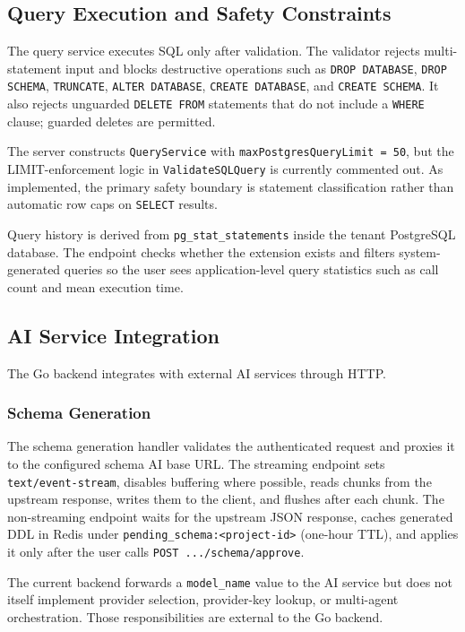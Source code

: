 \subsection{Query Execution and Safety Constraints}

The query service executes SQL only after validation. The validator rejects multi-statement input and blocks destructive operations such as \texttt{DROP DATABASE}, \texttt{DROP SCHEMA}, \texttt{TRUNCATE}, \texttt{ALTER DATABASE}, \texttt{CREATE DATABASE}, and \texttt{CREATE SCHEMA}. It also rejects unguarded \texttt{DELETE FROM} statements that do not include a \texttt{WHERE} clause; guarded deletes are permitted.

The server constructs \texttt{QueryService} with \texttt{maxPostgresQueryLimit = 50}, but the LIMIT-enforcement logic in \texttt{ValidateSQLQuery} is currently commented out. As implemented, the primary safety boundary is statement classification rather than automatic row caps on \texttt{SELECT} results.

Query history is derived from \texttt{pg\_stat\_statements} inside the tenant PostgreSQL database. The endpoint checks whether the extension exists and filters system-generated queries so the user sees application-level query statistics such as call count and mean execution time.

\subsection{AI Service Integration}

The Go backend integrates with external AI services through HTTP.

\subsubsection{Schema Generation}
The schema generation handler validates the authenticated request and proxies it to the configured schema AI base URL. The streaming endpoint sets \texttt{text/event-stream}, disables buffering where possible, reads chunks from the upstream response, writes them to the client, and flushes after each chunk. The non-streaming endpoint waits for the upstream JSON response, caches generated DDL in Redis under \texttt{pending\_schema:<project-id>} (one-hour TTL), and applies it only after the user calls \texttt{POST .../schema/approve}.

The current backend forwards a \texttt{model\_name} value to the AI service but does not itself implement provider selection, provider-key lookup, or multi-agent orchestration. Those responsibilities are external to the Go backend.

